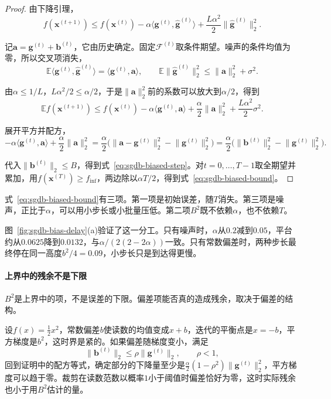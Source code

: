 \begin{proof}
由下降引理，
\[
 f(\bm{x}^{(t+1)})\leq f(\bm{x}^{(t)})-\alpha\langle\bm{g}^{(t)},\hat{\bm g}^{(t)}\rangle+\frac{L\alpha^2}{2}\lVert\hat{\bm g}^{(t)}\rVert_2^2 .
\]

记$\bm{a}=\bm{g}^{(t)}+\bm{b}^{(t)}$，它由历史确定。固定$\mathcal{F}^{(t)}$取条件期望。噪声的条件均值为零，所以交叉项消失，
\[
 \mathbb{E}\langle\bm{g}^{(t)},\hat{\bm g}^{(t)}\rangle=\langle\bm{g}^{(t)},\bm{a}\rangle,\qquad
 \mathbb{E}\lVert\hat{\bm g}^{(t)}\rVert_2^2\leq\lVert\bm{a}\rVert_2^2+\sigma^2 .
\]

由$\alpha\leq1/L$，$L\alpha^2/2\leq\alpha/2$，于是$\lVert\bm{a}\rVert_2^2$前的系数可以放大到$\alpha/2$，得到
\[
 \mathbb{E}f(\bm{x}^{(t+1)})\leq f(\bm{x}^{(t)})-\alpha\langle\bm{g}^{(t)},\bm{a}\rangle+\frac\alpha2\lVert\bm{a}\rVert_2^2+\frac{L\alpha^2}{2}\sigma^2 .
\]

展开平方并配方，
\[
 -\alpha\langle\bm{g}^{(t)},\bm{a}\rangle+\frac\alpha2\lVert\bm{a}\rVert_2^2
 =\frac\alpha2\bigl(\lVert\bm{a}-\bm{g}^{(t)}\rVert_2^2-\lVert\bm{g}^{(t)}\rVert_2^2\bigr)
 =\frac\alpha2\bigl(\lVert\bm{b}^{(t)}\rVert_2^2-\lVert\bm{g}^{(t)}\rVert_2^2\bigr).
\]

代入$\lVert\bm{b}^{(t)}\rVert_2\leq B$，得到式~\eqref{eq:sgdb-biased-step}。对$t=0,\ldots,T-1$取全期望并累加，用$f(\bm{x}^{(T)})\geq f_{\inf}$，两边除以$\alpha T/2$，得到式~\eqref{eq:sgdb-biased-bound}。
\end{proof}

式~\eqref{eq:sgdb-biased-bound}有三项。第一项是初始误差，随$T$消失。第三项是噪声，正比于$\alpha$，可以用小步长或小批量压低。第二项$B^2$既不依赖$\alpha$，也不依赖$T$。

图~\ref{fig:sgdb-bias-delay}(a)验证了这一分工。只有噪声时，$\alpha$从$0.2$减到$0.05$，平台约从$0.0625$降到$0.0132$，与$\alpha/(2(2-2\alpha))$一致。只有常数偏差时，两种步长最终停在同一高度$b^2/4=0.09$，小步长只是到达得更慢。

\paragraph{上界中的残余不是下限}
$B^2$是上界中的项，不是误差的下限。偏差项能否真的造成残余，取决于偏差的结构。

设$f(x)=\frac12x^2$，常数偏差$b$使读数的均值变成$x+b$，迭代的平衡点是$x=-b$，平方梯度是$b^2$，这时界是紧的。如果偏差随梯度变小，满足
\[
 \lVert\bm{b}^{(t)}\rVert_2\leq\rho\lVert\bm{g}^{(t)}\rVert_2,\qquad\rho<1,
\]
回到证明中的配方等式，确定部分的下降量至少是$\frac\alpha2(1-\rho^2)\lVert\bm{g}^{(t)}\rVert_2^2$，平方梯度可以趋于零。裁剪在读数范数以概率$1$小于阈值时偏差恰好为零，这时实际残余也小于用$B^2$估计的量。

